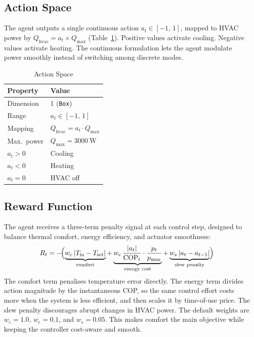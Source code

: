 \documentclass[conference]{IEEEtran}
\begin{document}
\subsection{Action Space}
\label{subsec:action-space}
The agent outputs a single continuous action $a_t \in [-1,\,1]$, mapped
to HVAC power by $Q_{\text{hvac}} = a_t \times Q_{\max}$
(Table~\ref{tab:action}). Positive values activate cooling. Negative
values activate heating. The continuous formulation lets the agent
modulate power smoothly instead of switching among discrete modes.

\begin{table}[!b]
  \centering
  \caption{Action Space}
  \label{tab:action}
  \begin{tabular}{ll}
    \toprule
    \textbf{Property} & \textbf{Value} \\
    \midrule
    Dimension       & 1 (\texttt{Box}) \\
    Range           & $a_t \in [-1,\,1]$ \\
    Mapping         & $Q_{\text{hvac}} = a_t \cdot Q_{\max}$ \\
    Max.\ power     & $Q_{\max} = \SI{3000}{\watt}$ \\
    \midrule
    $a_t > 0$       & Cooling \\
    $a_t < 0$       & Heating \\
    $a_t = 0$       & HVAC off \\
    \bottomrule
  \end{tabular}
\end{table}

\subsection{Reward Function}
\label{subsec:reward}
The agent receives a three-term penalty signal at each control step,
designed to balance thermal comfort, energy efficiency, and actuator
smoothness:
%
\begin{equation}
  \label{eq:reward}
  R_t = -\!\Bigl(
    \underbrace{w_c \,|T_{\text{in}} - T_{\text{set}}|}_{\text{comfort}}
    + \underbrace{w_e \,\frac{|a_t|}{\text{COP}_t} \cdot \frac{p_t}{p_{\max}}}_{\text{energy cost}}
    + \underbrace{w_s \,|a_t - a_{t-1}|}_{\text{slew penalty}}
  \Bigr)
\end{equation}
%
The comfort term penalises temperature error directly. The energy term
divides action magnitude by the instantaneous COP, so the same control
effort costs more when the system is less efficient, and then scales it by
time-of-use price. The slew penalty discourages abrupt changes in HVAC
power. The default weights are $w_c = 1.0$, $w_e = 0.1$, and
$w_s = 0.05$. This makes comfort the main objective while keeping the
controller cost-aware and smooth.
\end{document}
